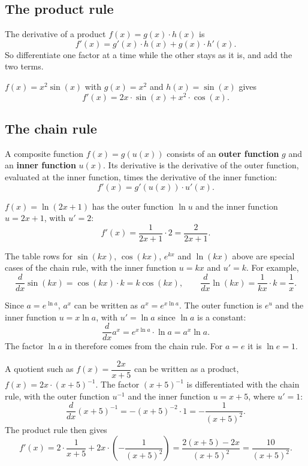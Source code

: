 \subsection{The product rule}
\label{c13:sec:produktregeln}
The derivative of a product $f(x) = g(x) \cdot h(x)$ is
\[
  f'(x) = g'(x) \cdot h(x) + g(x) \cdot h'(x).
\]
So differentiate one factor at a time while the other stays as it is, and add the two terms.

\begin{exempel}
$f(x) = x^2 \sin(x)$ with $g(x) = x^2$ and $h(x) = \sin(x)$ gives
\[
  f'(x) = 2x \cdot \sin(x) + x^2 \cdot \cos(x).
\]
\end{exempel}

\subsection{The chain rule}
\label{c13:sec:kedjeregeln}
A composite function $f(x) = g(u(x))$ consists of an \textbf{outer function} $g$ and an
\textbf{inner function} $u(x)$. Its derivative is the derivative of the outer function, evaluated
at the inner function, times the derivative of the inner function:
\[
  f'(x) = g'(u(x)) \cdot u'(x).
\]

\begin{exempel}
$f(x) = \ln(2x + 1)$ has the outer function $\ln u$ and the inner function $u = 2x + 1$, with
$u' = 2$:
\[
  f'(x) = \frac{1}{2x + 1} \cdot 2 = \frac{2}{2x + 1}.
\]
\end{exempel}

The table rows for $\sin(kx)$, $\cos(kx)$, $e^{kx}$ and $\ln(kx)$ above are special cases of the
chain rule, with the inner function $u = kx$ and $u' = k$. For example,
\[
  \frac{d}{dx}\sin(kx) = \cos(kx) \cdot k = k\cos(kx), \qquad
  \frac{d}{dx}\ln(kx) = \frac{1}{kx} \cdot k = \frac{1}{x}.
\]

\begin{exempel}
Since $a = e^{\ln a}$, $a^x$ can be written as $a^x = e^{x \ln a}$. The outer function is $e^u$
and the inner function $u = x \ln a$, with $u' = \ln a$ since $\ln a$ is a constant:
\[
  \frac{d}{dx}a^x = e^{x \ln a} \cdot \ln a = a^x \ln a.
\]
The factor $\ln a$ in  therefore comes from the chain rule. For $a = e$ it is
$\ln e = 1$.
\end{exempel}

\begin{exempel}
A quotient such as $f(x) = \dfrac{2x}{x + 5}$ can be written as a product,
$f(x) = 2x \cdot (x + 5)^{-1}$. The factor $(x + 5)^{-1}$ is differentiated with the chain rule,
with the outer function $u^{-1}$ and the inner function $u = x + 5$, where $u' = 1$:
\[
  \frac{d}{dx}(x + 5)^{-1} = -(x + 5)^{-2} \cdot 1 = -\frac{1}{(x + 5)^2}.
\]
The product rule then gives
\[
  f'(x) = 2 \cdot \frac{1}{x + 5} + 2x \cdot \left(-\frac{1}{(x + 5)^2}\right)
  = \frac{2(x + 5) - 2x}{(x + 5)^2} = \frac{10}{(x + 5)^2}.
\]
\end{exempel}

